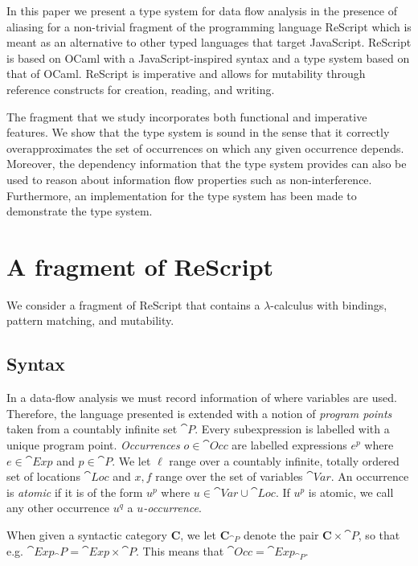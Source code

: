 \documentclass{eptcs}
\begin{document}
In this paper we present a type system for data flow analysis in the
presence of aliasing for a non-trivial fragment of the programming
language ReScript which is meant as an alternative to other typed
languages that target JavaScript. ReScript is based on OCaml with a
JavaScript-inspired syntax and a type system based on that of
OCaml\cite{rescript_rebrand}. ReScript is imperative and allows for
mutability through reference constructs for creation, reading, and
writing.

The fragment that we study incorporates both functional and imperative
features. We show that the type system is sound in the sense that it
correctly overapproximates the set of occurrences on which any given
occurrence depends. Moreover, the dependency information that the type
system provides can also be used to reason about information flow
properties such as non-interference.  Furthermore, an implementation
for the type system has been made to demonstrate the type system. 

\section{A fragment of ReScript}\label{sec:lang}

We consider a fragment of ReScript that contains a $\lambda$-calculus
with bindings, pattern matching, and mutability.
 
\subsection{Syntax}

In a data-flow analysis we must record information of where variables
are used.  Therefore, the language presented is extended with a notion
of \emph{program points} taken from a countably infinite set
$\cat{P}$.
%
Every subexpression is labelled with a unique program
point. \emph{Occurrences} $o \in \cat{Occ}$ are labelled expressions
$e^p$ where $e \in \cat{Exp}$ and $p \in \cat{P}$. We let $\ell$ range
over a countably infinite, totally ordered set of locations
$\cat{Loc}$ and $x,f$ range over the set of variables $\cat{Var}$.  An
occurrence is \emph{atomic} if it is of the form $u^p$ where
$u \in \cat{Var} \cup \cat{Loc}$. If $u^p$ is atomic, we call any
other occurrence $u^q$ a \emph{$u$-occurrence}.

When given a syntactic category $\mathbf{C}$, we let
$\mathbf{C}_{\cat{P}}$ denote the pair $\mathbf{C}\times\cat{P}$, so
that e.g.  $\cat{Exp}_\cat{P}=\cat{Exp}\times\cat{P}$.  This means
that $\cat{Occ}=\cat{Exp}_{\cat{P}}$.
\end{document}
